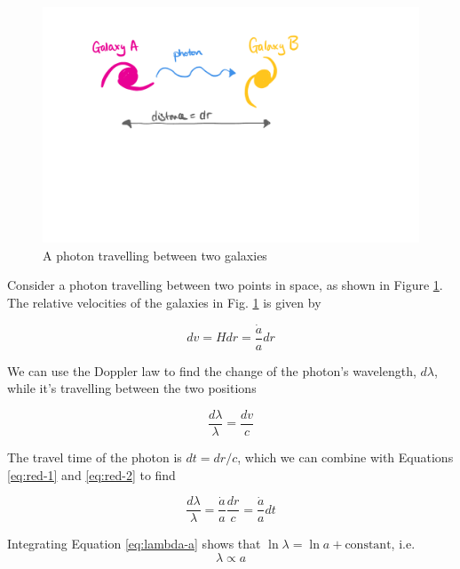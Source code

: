 \documentclass[11pt,a4paper,notoc]{tufte-handout}
\begin{document}
\begin{figure}
\includegraphics[width=1\linewidth]{Images/redshift-galaxies} \caption{A photon travelling between two galaxies}\label{fig:redshift-galaxies}
\end{figure}

Consider a photon travelling between two points in space, as shown in
Figure \ref{fig:redshift-galaxies}. The relative velocities of the
galaxies in
Fig. \ref{fig:redshift-galaxies} is given by

\begin{equation}
dv = H dr = \dfrac{\dot{a}}{a} dr
\label{eq:red-1}
\end{equation}

We can use the Doppler law to
find the change of the photon's wavelength, \(d\lambda\), while it's
travelling between the two positions

\begin{equation}
\dfrac{d\lambda}{\lambda} = \dfrac{dv}{c}
\label{eq:red-2}
\end{equation}

The travel time of the
photon is \(dt = dr/c\), which we can combine with
Equations \eqref{eq:red-1} and \eqref{eq:red-2}
to find

\begin{equation}
\dfrac{d\lambda}{\lambda} = \dfrac{\dot{a}}{a} \dfrac{dr}{c} = \dfrac{\dot{a}}{a} dt
\label{eq:lambda-a}
\end{equation}

Integrating Equation \eqref{eq:lambda-a} shows that
\(\ln \lambda = \ln a + \text{constant}\), i.e.
\begin{equation}
\lambda \propto a
\label{eq:lambda-a-2}
\end{equation}
\end{document}

